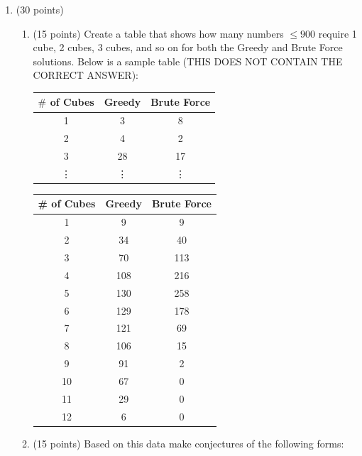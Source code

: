 \documentclass[12pt]{article}
\begin{document}
\begin{enumerate}
\begin{enumerate}
\newpage

\item
(30 points)\begin{enumerate}
    \item (15 points)
Create a table that shows how many numbers $\leq 900$ require 1 cube, 2 cubes, 3 cubes, and so on for both the Greedy and Brute Force solutions. Below is a sample table (THIS DOES NOT CONTAIN THE CORRECT ANSWER):
\begin{center}
    \begin{tabular}{|c|c|c|}
     \hline  $\# $ of Cubes & Greedy & Brute Force  \\ \hline
        1 & 3 & 8 \\
        2 & 4 & 2 \\
        3 & 28 & 17 \\
        \vdots & \vdots &\vdots \\ \hline
    \end{tabular}
\end{center}
\begin{table}[h]
\centering
\begin{tabular}{|c|c|c|}
\hline
\# of Cubes & Greedy & Brute Force \\ 
\hline
1  & 9   & 9   \\ 
2  & 34  & 40  \\ 
3  & 70  & 113 \\ 
4  & 108 & 216 \\ 
5  & 130 & 258 \\ 
6  & 129 & 178 \\ 
7  & 121 & 69  \\ 
8  & 106 & 15  \\ 
9  & 91  & 2   \\ 
10 & 67  & 0   \\ 
11 & 29  & 0   \\ 
12 & 6   & 0   \\ 
\hline
\end{tabular}
\end{table}

\item (15 points) Based on this data make conjectures of the following forms:


\end{enumerate}
\end{enumerate}
\end{enumerate}
\end{document}

